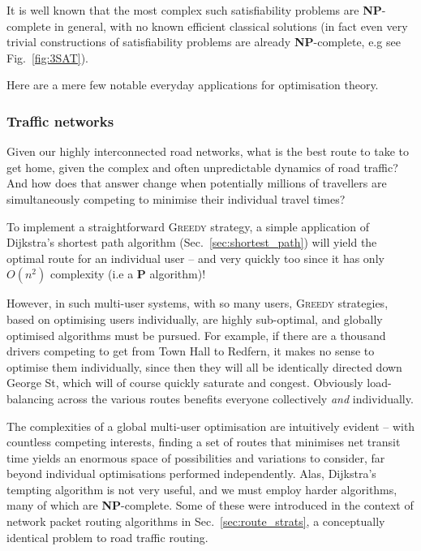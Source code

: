 It is well known that the most complex such satisfiability problems are \textbf{NP}-complete in general, with no known efficient classical solutions (in fact even very trivial constructions of satisfiability problems are already \textbf{NP}-complete, e.g see Fig.~\ref{fig:3SAT}).

Here are a mere few notable everyday applications for optimisation theory.

\subsubsection{Traffic networks}

Given our highly interconnected road networks, what is the best route to take to get home, given the  complex and often unpredictable dynamics of road traffic? And how does that answer change when potentially millions of travellers are simultaneously competing to minimise their individual travel times?

To implement a straightforward \textsc{Greedy} strategy, a simple application of Dijkstra's shortest path algorithm (Sec.~\ref{sec:shortest_path}) will yield the optimal route for an individual user -- and very quickly too since it has only $O(n^2)$ complexity (i.e a \textbf{P} algorithm)!

However, in such multi-user systems, with so many users, \textsc{Greedy} strategies, based on optimising users individually, are highly sub-optimal, and globally optimised algorithms must be pursued. For example, if there are a thousand drivers competing to get from Town Hall to Redfern, it makes no sense to optimise them individually, since then they will all be identically directed down George St, which will of course quickly saturate and congest. Obviously load-balancing across the various routes benefits everyone collectively \textit{and} individually.

The complexities of a global multi-user optimisation are intuitively evident -- with countless competing interests, finding a set of routes that minimises net transit time yields an enormous space of possibilities and variations to consider, far beyond individual optimisations performed independently. Alas, Dijkstra's tempting algorithm is not very useful, and we must employ harder algorithms, many of which are \textbf{NP}-complete. Some of these were introduced in the context of network packet routing algorithms in Sec.~\ref{sec:route_strats}, a conceptually identical problem to road traffic routing.

